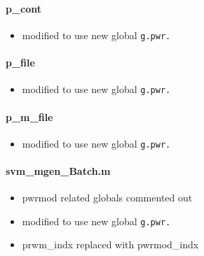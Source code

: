 \documentclass[12pt]{article}
\begin{document}
\paragraph{p\_cont}
	\begin{itemize}
		\item modified to use new global \verb|g.pwr.|
	\end{itemize}
\paragraph{p\_file}
	\begin{itemize}
		\item modified to use new global \verb|g.pwr.|
	\end{itemize}
\paragraph{p\_m\_file}
	\begin{itemize}
		\item modified to use new global \verb|g.pwr.|
	\end{itemize}

\paragraph{svm\_mgen\_Batch.m}
	\begin{itemize}
		\item pwrmod related globals commented out
		\item modified to use new global \verb|g.pwr.|
		\item prwm\_indx replaced with pwrmod\_indx
	\end{itemize}
	
\end{document}
